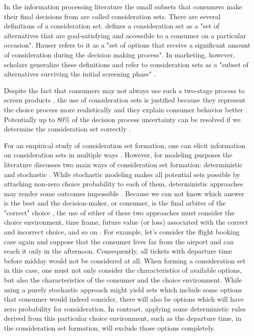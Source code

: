 \documentclass[a4paper,12pt]{article}
\newcommand{\citeyearonly}[1]{\citeyearpar{#1}}
\begin{document}
In the information processing literature the small subsets that consumers make their final decisions from are called consideration sets. There are several definitions of a consideration set. \citep{shocker1991consideration} defines a consideration set as a "set of alternatives that are goal-satisfying and accessible to a consumer on a particular occasion". Hauser \citeyearonly{hauser1990evaluation} refers to it as a "set of options that receive a significant amount of consideration during the decision making process". In marketing, however, scholars generalize these definitions and  refer to consideration sets as a "subset of alternatives surviving the initial screening phase" \citep{haubl2000consumer}. 

Despite the fact that consumers may not always use such a two-stage process to screen products \citep{hauser2009non}, the use of consideration sets is justified because they represent the choice process more realistically and they explain consumer behavior better \citep{horowitz1995role}. Potentially up to 80\% of the decision process uncertainty can be resolved if we determine the consideration set correctly \citep{hauser1978testing}. 

For an empirical study of consideration set formation, one can elicit information on consideration sets in multiple ways \citep{ding2011unstructured,gaskin2007two,yee2007greedoid}. However, for modeling purposes the literature discusses two main ways of consideration set formation: deterministic \citep{coombs1951mathematical} and stochastic \citep{mcfadden1973conditional, urban1984testing}. While stochastic modeling makes all potential sets possible by attaching non-zero choice probability to each of them, deterministic approaches may render some outcomes impossible \citep{aribarg2018advancing}. Because we can not know which answer is the best and the decision-maker, or consumer, is the final arbiter of the "correct" choice \citep{hauser2014consideration}, the use of either of these two approaches must consider the choice environment, time frame, future value (or loss) associated with the correct and incorrect choice, and so on \citep{punj2009information}. For example, let's consider the flight booking case again and suppose that the consumer lives far from the airport and can reach it only in the afternoon. Consequently, all tickets with departure time before midday would not be considered at all. When forming a consideration set in this case, one must not only consider the characteristics of available options, but also the characteristics of the consumer and the choice environment. While using a purely stochastic approach might yield sets which include some options that consumer would indeed consider, there will also be options which will have zero probability for consideration. In contrast, applying some deterministic rules derived from this particular choice environment, such as the departure time, in the consideration set formation, will exclude those options completely.
\end{document}
